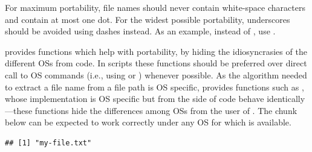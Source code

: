 \documentclass[krantz2]{krantz}\usepackage{knitr}
\begin{document}
\begin{warningbox}
For maximum portability, file names should never contain white-space characters and contain at most one dot. For the widest possible portability, underscores should be avoided using dashes instead. As an example, instead of , use .
\end{warningbox}

\Rlang provides functions which help with portability, by hiding the idiosyncrasies of the different OSs from \Rlang code. In scripts these functions should be preferred over direct call to OS commands (i.e., using  or ) whenever possible. As the algorithm needed to extract a file name from a file path is OS specific, \Rlang provides functions such as , whose implementation is OS specific but from the side of \Rlang code behave identically---these functions hide the differences among OSs from the user of \Rlang. The chunk below can be expected to work correctly under any OS for which \Rlang is available.

\begin{knitrout}\footnotesize
{}\color{fgcolor}\begin{kframe}
\begin{alltt}
\hlstd{(}\hlstd{)}
\end{alltt}
\begin{verbatim}
## [1] "my-file.txt"
\end{verbatim}
\end{kframe}
\end{knitrout}
\end{document}
